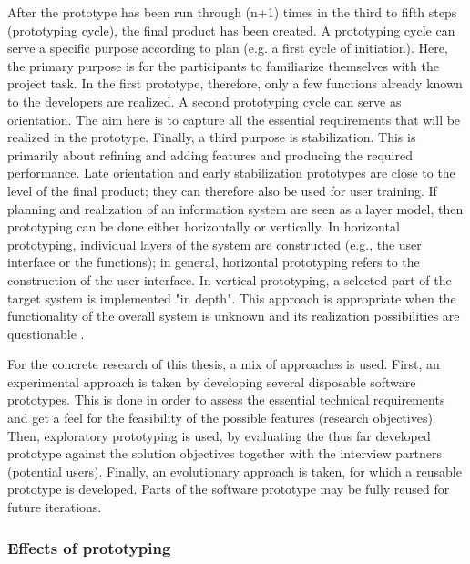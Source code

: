 After the prototype has been run through (n+1) times in the third to fifth steps (prototyping cycle), the final product has been created. A prototyping cycle can serve a specific purpose according to plan (e.g. a first cycle of initiation). Here, the primary purpose is for the participants to familiarize themselves with the project task. In the first prototype, therefore, only a few functions already known to the developers are realized. A second prototyping cycle can serve as orientation. The aim here is to capture all the essential requirements that will be realized in the prototype. Finally, a third purpose is stabilization. This is primarily about refining and adding features and producing the required performance. Late orientation and early stabilization prototypes are close to the level of the final product; they can therefore also be used for user training. If planning and realization of an information system are seen as a layer model, then prototyping can be done either horizontally or vertically. In horizontal prototyping, individual layers of the system are constructed (e.g., the user interface or the functions); in general, horizontal prototyping refers to the construction of the user interface. In vertical prototyping, a selected part of the target system is implemented "in depth". This approach is appropriate when the functionality of the overall system is unknown and its realization possibilities are questionable
\autocite{riedlManagementInformatik2019}.

For the concrete research of this thesis,
a mix of approaches is used.
First,
an experimental approach is taken
by developing several disposable software prototypes.
This is done in order to assess the essential technical requirements
and get a feel for the feasibility of the possible features (research objectives).
Then,
exploratory prototyping is used,
by evaluating the thus far developed prototype against the solution objectives
together with the interview partners (potential users).
Finally,
an evolutionary approach is taken,
for which a reusable prototype is developed.
Parts of the software prototype may be fully reused for future iterations.

\subsubsection*{Effects of prototyping}

